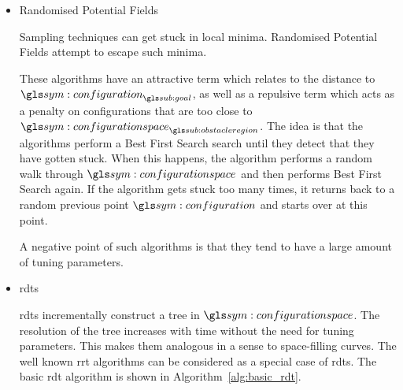 \begin{itemize}




					\item Randomised Potential Fields

						Sampling techniques can get stuck in local minima.
						Randomised Potential Fields attempt to escape such
						minima.

						These algorithms have an attractive term which relates
						to the distance to $\configuration_{\goal}$, as well as
						a repulsive term which acts as a penalty on
						configurations that are too close to
						$\configurationspace_{\obstacleregion}$. The idea is
						that the algorithms perform a Best First Search search
						until they detect that they have gotten stuck. When this
						happens, the algorithm performs a random walk through
						$\configurationspace$ and  then performs Best First
						Search again. If the algorithm gets stuck too many
						times, it returns back to a random previous point
						$\configuration$ and starts over at this point.

						A negative point of such algorithms is that they tend to
						have a large amount of tuning parameters.

					\item \glspl{rdt}

						\glspl{rdt} incrementally construct a tree in
						$\configurationspace$. The resolution of the tree
						increases with time without the need for tuning
						parameters. This makes them analogous in a sense to
						space-filling curves. The well known \gls{rrt}
						algorithms can be considered as a special case of
						\glspl{rdt}. The basic \gls{rdt} algorithm is shown in
						Algorithm~\ref{alg:basic_rdt}.


\end{itemize}
